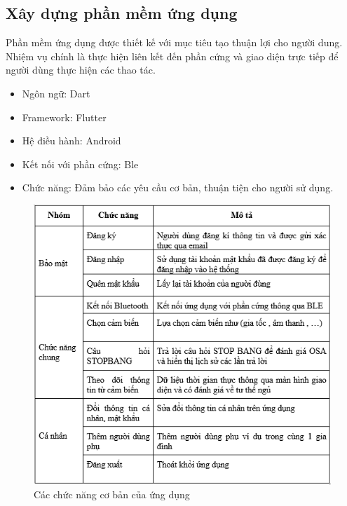 \subsection{Xây dựng phần mềm ứng dụng}

Phần mềm ứng dụng được thiết kế với mục tiêu tạo thuận lợi cho người dung. Nhiệm vụ chính là thực hiện liên kết đến phần cứng và giao diện trực tiếp để người dùng thực hiện các thao tác. 

\begin{itemize}
    \item Ngôn ngữ: Dart
    
    \item Framework: Flutter
    
    \item Hệ điều hành: Android
    
    \item Kết nối với phần cứng: Ble
    
    \item Chức năng: Đảm bảo các yêu cầu cơ bản, thuận tiện cho người sử dụng.
\end{itemize}
\begin{figure}[!]
		\centering
 		\includegraphics[width=1\textwidth]{images/app_flow.png}
		\caption{Các chức năng cơ bản của ứng dụng}
		\label{app_flow}
\end{figure}

